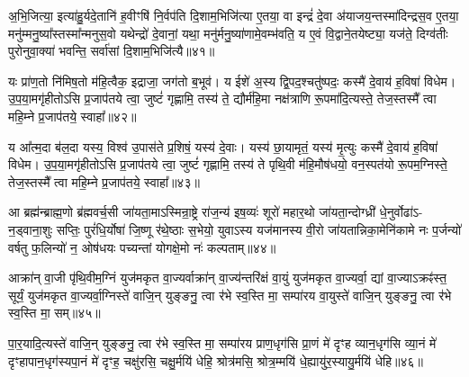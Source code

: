 अ॒भि॒जित्या॒ इत्या॑हु॒र्यदे॒तानि॑ ह॒वीꣳषि॑ नि॒र्वप॑ति दि॒शाम॒भिजि॑त्या ए॒तया॒ वा इन्द्रं॑ दे॒वा अ॑याजय॒न्तस्मा॑दिन्द्रस॒व ए॒तया॒ मनु॑म्मनु॒ष्या᳚स्तस्मा᳚न्मनुस॒वो यथेन्द्रो॑ दे॒वानां॒ यथा॒ मनु॑र्मनु॒ष्या॑णामे॒वम्भ॑वति॒ य ए॒वं वि॒द्वाने॒तयेष्ट्या॒ यज॑ते॒ दिग्व॑तीः पुरोनुवा॒क्या॑ भवन्ति॒ सर्वा॑सां दि॒शाम॒भिजि॑त्यै॥४१॥

{\anuvakamend[{अशा᳚न्तः सुषुवा॒णेनैक॑चत्वारिꣳशच्च॥15॥}]}

यः प्रा॑ण॒तो नि॑मिष॒तो म॑हि॒त्वैक॒ इद्राजा॒ जग॑तो ब॒भूव॑। य ईशे॑ अ॒स्य द्वि॒पद॒श्चतु॑ष्पदः॒ कस्मै॑ दे॒वाय॑ ह॒विषा॑ विधेम। उ॒प॒या॒मगृ॑हीतो\-ऽसि प्र॒जाप॑तये त्वा॒ जुष्टं॑ गृह्णामि॒ तस्य॑ ते॒ द्यौर्म॑हि॒मा नक्ष॑त्राणि रू॒पमा॑दि॒त्यस्ते॒ तेज॒स्तस्मै᳚ त्वा महि॒म्ने प्र॒जाप॑तये॒ स्वाहा᳚॥४२॥

{\anuvakamend[{यः प्रा॑ण॒तो द्यौरा॑दि॒त्यो᳚\-ऽष्टात्रिꣳ॑शत्॥16॥}]}

य आ᳚त्म॒दा ब॑ल॒दा यस्य॒ विश्व॑ उ॒पास॑ते प्र॒शिषं॒ यस्य॑ दे॒वाः। यस्य॑ छा॒यामृतं॒ यस्य॑ मृ॒त्युः कस्मै॑ दे॒वाय॑ ह॒विषा॑ विधेम। उ॒प॒या॒मगृ॑हीतो\-ऽसि प्र॒जाप॑तये त्वा॒ जुष्टं॑ गृह्णामि॒ तस्य॑ ते पृथि॒वी म॑हि॒मौष॑धयो॒ वन॒स्पत॑यो रू॒पम॒ग्निस्ते॒ तेज॒स्तस्मै᳚ त्वा महि॒म्ने प्र॒जाप॑तये॒ स्वाहा᳚॥४३॥

{\anuvakamend[{य आ᳚त्म॒दाः पृ॑थि॒व्य॑ग्निरेका॒न्नच॑त्वारि॒ꣳ॒शत्॥17॥}]}

आ ब्रह्म॑न्ब्राह्म॒णो ब्र॑ह्मवर्च॒सी जा॑यता॒मा\-ऽस्मिन्रा॒ष्ट्रे रा॑ज॒न्य॑ इष॒व्यः॑ शूरो॑ महार॒थो जा॑यता॒न्दोग्ध्री॑ धे॒नुर्वोढा॑\-ऽ- न॒ड्वाना॒शुः सप्तिः॒ पुरं॑धि॒र्योषा॑ जि॒ष्णू र॑थे॒ष्ठाः स॒भेयो॒ युवा\-ऽस्य यज॑मानस्य वी॒रो जा॑यतान्निका॒मेनि॑कामे नः प॒र्जन्यो॑ वर्\mbox{}षतु फ॒लिन्यो॑ न॒ ओष॑धयः पच्यन्तां योगक्षे॒मो नः॑ कल्पताम्॥४४॥

{\anuvakamend[{आ ब्रह्म॒न्नेक॑चत्वारिꣳशत्॥18॥}]}

आक्रा॑न् वा॒जी पृ॑थि॒वीम॒ग्निं युज॑मकृत वा॒ज्यर्वाक्रा॑न् वा॒ज्य॑न्तरि॑क्षं वा॒युं युज॑मकृत वा॒ज्यर्वा॒ द्यां वा॒ज्या\-ऽक्रꣴ॑स्त॒ सूर्यं॒ युज॑मकृत वा॒ज्यर्वा॒ग्निस्ते॑ वाजि॒न् युङ्ङनु॒ त्वा र॑भे स्व॒स्ति मा॒ सम्पा॑रय वा॒युस्ते॑ वाजि॒न् युङ्ङनु॒ त्वा र॑भे स्व॒स्ति मा॒ सम्॥४५॥

पा॒र॒यादि॒त्यस्ते॑ वाजि॒न् युङ्ङनु॒ त्वा र॑भे स्व॒स्ति मा॒ सम्पा॑रय प्राण॒धृग॑सि प्रा॒णं मे॑ दृꣳह व्यान॒धृग॑सि व्या॒नं मे॑ दृꣳहापान॒धृग॑स्यपा॒नं मे॑ दृꣳह॒ चक्षु॑रसि॒ चक्षु॒र्मयि॑ धेहि॒ श्रोत्र॑मसि॒ श्रोत्र॒म्मयि॑ धे॒ह्यायु॑र॒स्यायु॒र्मयि॑ धेहि॥४६॥

{\anuvakamend[{वा॒युस्ते॑ वाजि॒न् युङ्ङनु॒ त्वा र॑भे स्व॒स्ति मा॒ सन्त्रिच॑त्वारिꣳशच्च॥19॥}]}

